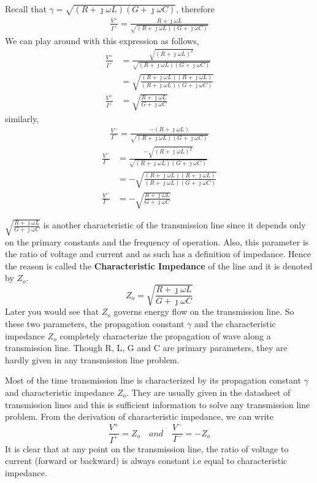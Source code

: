 Recall that $\gamma = \sqrt{(R + \jmath\omega L)(G + \jmath\omega C)}$, therefore
\begin{align*}
\frac{V^+}{I^+} = \frac{R+\jmath\omega L}{\sqrt{(R + \jmath\omega L)(G + \jmath\omega C)}}
\end{align*}
We can play around with this expression as follows,
\begin{align*}
\frac{V^+}{I^+} &= \frac{\sqrt{(R+\jmath\omega L)^2}}{\sqrt{(R + \jmath\omega L)(G + \jmath\omega C)}}\\
&=\sqrt{\frac{(R+\jmath\omega L)(R+\jmath\omega L)}{(R + \jmath\omega L)(G + \jmath\omega C)}}\\
\frac{V^+}{I^+} &=\sqrt{\frac{R+\jmath\omega L}{G+\jmath\omega C}}
\end{align*}
similarly,
\begin{align*}
\frac{V^-}{I^-} = \frac{-(R+\jmath\omega L)}{\sqrt{(R + \jmath\omega L)(G + \jmath\omega C)}}
\end{align*}
\begin{align*}
\frac{V^-}{I^-} &= \frac{-\sqrt{(R+\jmath\omega L)^2}}{\sqrt{(R + \jmath\omega L)(G + \jmath\omega C)}}\\
&=-\sqrt{\frac{(R+\jmath\omega L)(R+\jmath\omega L)}{(R + \jmath\omega L)(G + \jmath\omega C)}}\\
\frac{V^-}{I^-} &=-\sqrt{\frac{R+\jmath\omega L}{G+\jmath\omega C}}
\end{align*}

$\sqrt{\frac{R+\jmath\omega L}{G+\jmath\omega C}}$ is another characteristic of the transmission line since it depends only on the primary constants and the frequency of operation. Also, this parameter is the ratio of voltage and current and as such has a definition of impedance. Hence the reason is called the \textbf{Characteristic Impedance} of the line and it is denoted by $Z_o$.
\begin{equation}
Z_o = \sqrt{\frac{R+\jmath\omega L}{G+\jmath\omega C}}
\end{equation}
Later you would see that $Z_o$ governs energy flow on the transmission line. So these two parameters, the propagation constant $\gamma$ and the characteristic impedance $Z_o$ completely characterize the propagation of wave along a transmission line. Though R, L, G and C are primary parameters, they are hardly given in any transmission line problem. 

Most of the time transmission line is characterized by its propagation constant $\gamma$ and characteristic impedance $Z_o$. They are usually given in the datasheet of transmission lines and this is sufficient information to solve any transmission line problem.
From the derivation of characteristic impedance, we can write
\begin{equation}
\frac{V^+}{I^+} = Z_o\quad and\quad \frac{V^-}{I^-} = -Z_o
\end{equation}
It is clear that at any point on the transmission line, the ratio of voltage to current (forward or backward) is always constant i.e equal to characteristic impedance.

